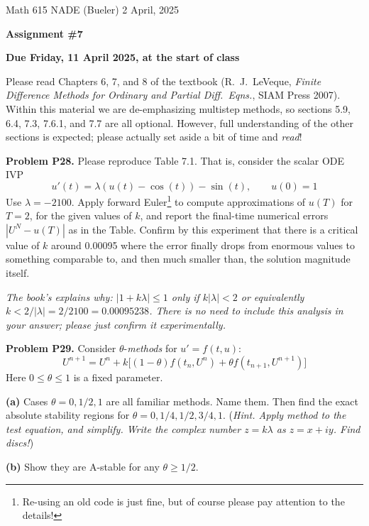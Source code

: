 \documentclass[12pt]{amsart}
\newcommand{\prob}[1]{\bigskip\noindent\textbf{#1}\quad }
\newcommand{\epart}[1]{\medskip\noindent\textbf{(#1)}\quad }
\begin{document}
\scriptsize \noindent Math 615 NADE (Bueler) \hfill 2 April, 2025
\normalsize

\medskip\bigskip

\Large\centerline{\textbf{Assignment \#7}}
\large
\bigskip

\centerline{\textbf{Due Friday, 11 April 2025, at the start of class}}
\bigskip
\normalsize

\thispagestyle{empty}

\bigskip
Please read Chapters 6, 7, and 8 of the textbook (R.~J.~LeVeque, \emph{Finite Difference Methods for Ordinary and Partial Diff.~Eqns.}, SIAM Press 2007).  Within this material we are de-emphasizing multistep methods, so sections 5.9, 6.4, 7.3, 7.6.1, and 7.7 are all optional.  However, full understanding of the other sections is expected; please actually set aside a bit of time and \emph{read}!

\medskip


\prob{Problem P28.}  Please reproduce Table 7.1.  That is, consider the scalar ODE IVP
	$$u'(t) = \lambda \left( u(t) - \cos(t) \right) - \sin(t), \qquad u(0)=1$$
Use $\lambda=-2100$.  Apply forward Euler\footnote{Re-using an old code is just fine, but of course please pay attention to the details!} to compute approximations of $u(T)$ for $T=2$, for the given values of $k$, and report the final-time numerical errors $|U^N - u(T)|$ as in the Table.  Confirm by this experiment that there is a critical value of $k$ around 0.00095 where the error finally drops from enormous values to something comparable to, and then much smaller than, the solution magnitude itself.

\medskip
\noindent \emph{The book's explains why: $|1+k\lambda| \le 1$ only if $k|\lambda|<2$ or equivalently $k < 2/|\lambda| = 2/2100 = 0.00095238$.  There is no need to include this analysis in your answer; please just confirm it experimentally.}


\prob{Problem P29.}  Consider $\theta$-\emph{methods} for $u' = f(t,u)$:
   $$U^{n+1} = U^n + k\Big[(1-\theta)f(t_n,U^n) + \theta f(t_{n+1},U^{n+1})\Big]$$
Here $0\le \theta \le 1$ is a fixed parameter.

\epart{a} Cases $\theta = 0,1/2,1$ are all familiar methods.  Name them.  Then find the exact absolute stability regions for $\theta = 0,1/4,1/2,3/4,1$.  (\emph{Hint. Apply method to the test equation, and simplify.  Write the complex number $z=k\lambda$ as $z=x+iy$.  Find discs!})

\epart{b} Show they are A-stable for any $\theta \geq 1/2$.
\end{document}
